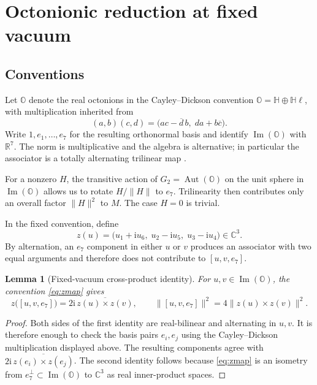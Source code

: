 \documentclass[11pt]{article}
\newcommand{\Oa}{\mathbb{O}}
\newcommand{\R}{\mathbb{R}}
\newcommand{\C}{\mathbb{C}}
\newcommand{\ii}{\mathrm{i}}
\newcommand{\norm}[1]{\lVert #1\rVert}
\newtheorem{lemma}[theorem]{Lemma}
\theoremstyle{remark}
\begin{document}
\section{Octonionic reduction at fixed vacuum}

\subsection{Conventions}

Let $\Oa$ denote the real octonions in the Cayley--Dickson convention $\Oa=\mathbb{H}\oplus\mathbb{H}\ell$, with multiplication inherited from
\[
 (a,b)(c,d)=\bigl(ac-\overline d\,b,\; da+b\overline c\bigr).
\]
Write $1,e_1,\ldots,e_7$ for the resulting orthonormal basis and identify $\operatorname{Im}(\Oa)$ with $\R^7$.  The norm is multiplicative and the algebra is alternative; in particular the associator is a totally alternating trilinear map \cite{Schafer1966,Baez2002}.

For a nonzero $H$, the transitive action of $G_2=\operatorname{Aut}(\Oa)$ on the unit sphere in $\operatorname{Im}(\Oa)$ allows us to rotate $H/\norm H$ to $e_7$.  Trilinearity then contributes only an overall factor $\norm H^2$ to $M$.  The case $H=0$ is trivial.

In the fixed convention, define
\begin{equation}
 z(u)=\bigl(u_1+\ii u_6,\;u_2-\ii u_5,\;u_3-\ii u_4\bigr)\in\C^3.
 \label{eq:zmap}
\end{equation}
By alternation, an $e_7$ component in either $u$ or $v$ produces an
associator with two equal arguments and therefore does not contribute to
$[u,v,e_7]$.

\begin{lemma}[Fixed-vacuum cross-product identity]
For $u,v\in\operatorname{Im}(\Oa)$, the convention \eqref{eq:zmap} gives
\begin{equation}
 z\bigl([u,v,e_7]\bigr)=2\ii\,\overline{z(u)\times z(v)},
 \qquad
 \norm{[u,v,e_7]}^2=4\norm{z(u)\times z(v)}^2.
 \label{eq:cross}
\end{equation}
\end{lemma}

\begin{proof}
Both sides of the first identity are real-bilinear and alternating in $u,v$.  It is therefore enough to check the basis pairs $e_i,e_j$ using the Cayley--Dickson multiplication displayed above.  The resulting components agree with $2\ii\,\overline{z(e_i)\times z(e_j)}$.  The second identity follows because \eqref{eq:zmap} is an isometry from $e_7^\perp\subset\operatorname{Im}(\Oa)$ to $\C^3$ as real inner-product spaces.
\end{proof}
\end{document}
